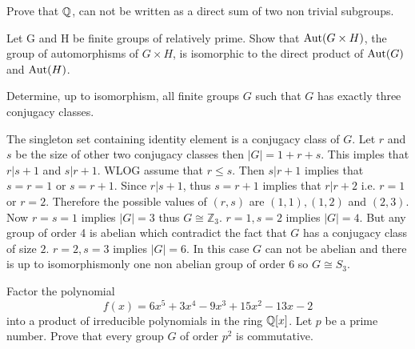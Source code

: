 \question Prove that $\mathbb{Q}$, can not be written as a direct sum of two non trivial subgroups.

\question Let G and H be finite groups of relatively prime. Show that $\operatorname{Aut}(G\times H)$, the group of automorphisms of $G\times H$, is isomorphic to the direct product of $\operatorname{Aut}(G)$ and $\operatorname{Aut}(H)$.

\question[8B, Fall14] Determine, up to isomorphism, all finite groups $G$ such that $G$ has exactly three conjugacy classes.
\begin{solution}
    The singleton set containing identity element is a conjugacy class of $G$. Let $r$ and $s$ be the size of other two conjugacy classes then $|G|=1+r+s$. This imples that $r|s+1$ and $s|r+1$. WLOG assume that $r\leq s$. Then $s|r+1$ implies that $s=r=1$ or $s=r+1$. Since $r|s+1$, thus $s=r+1$ implies that $r|r+2$ i.e. $r=1$ or $r=2$. Therefore the possible values of $(r,s)$ are $(1,1), (1,2)$ and $(2,3)$. Now $r=s=1$ implies $|G|=3$ thus $G\cong\mathbb{Z}_3$. $r=1,s=2$ implies $|G|=4$. But any group of order 4 is abelian which contradict the fact that $G$ has a conjugacy class of size $2$. $r=2,s=3$ implies $|G|=6$. In this case $G$ can not be abelian and there is up to isomorphismonly one non abelian group of order 6 so $G\cong S_3$. 
\end{solution}

\question[8B, Sp16] Factor the polynomial
$$f(x)=6x^5+3x^4-9x^3 +15x^2-13x-2$$
into a product of irreducible polynomials in the ring $\mathbb{Q}[x]$.
\question[9B, Sp16] Let $p$ be a prime number. Prove that every group $G$ of order $p^2$ is commutative.